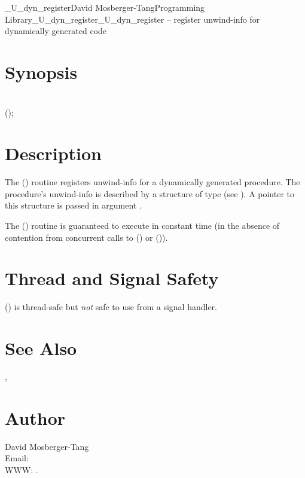\documentclass{article}
\begin{document}
\begin{Name}{3}{\_U\_dyn\_register}{David Mosberger-Tang}{Programming Library}{\_U\_dyn\_register}\_U\_dyn\_register -- register unwind-info for dynamically generated code
\end{Name}

\section{Synopsis}

\\

 ();\\

\section{Description}

The () routine registers unwind-info for a
dynamically generated procedure.  The procedure's unwind-info is
described by a structure of type  (see
).  A pointer to this structure is
passed in argument .

The () routine is guaranteed to execute in
constant time (in the absence of contention from concurrent calls to
() or ()).


\section{Thread and Signal Safety}

() is thread-safe but \emph{not} safe to use
from a signal handler.

\section{See Also}

, 

\section{Author}

\noindent
David Mosberger-Tang\\
Email: \\
WWW: .
\LatexManEnd
\end{document}
